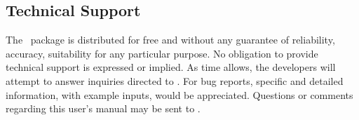 \subsection{Technical Support} The \PSIfour\ package is
distributed for free and without any guarantee of reliability,
accuracy, suitability for any particular purpose.  No obligation
to provide technical support is expressed or implied.  As time
allows, the developers will attempt to answer inquiries directed to
.
For bug reports, specific and detailed information, with example
inputs, would be appreciated.  Questions or comments regarding
this user's manual may be sent to .



